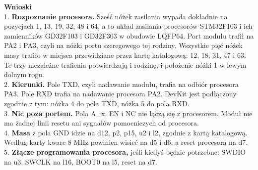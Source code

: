 \documentclass[10pt]{article}
\begin{document}
\vspace{10pt}
\textbf{Wnioski}\\[3pt]
1. \textbf{Rozpoznanie procesora.} Sześć nóżek zasilania wypada dokładnie na pozycjach 1, 13, 19, 32, 48 i 64, a to układ zasilania procesorów STM32F103 i ich zamienników GD32F103 i GD32F303 w obudowie LQFP64. Port modułu trafił na PA2 i PA3, czyli na nóżki portu szeregowego tej rodziny. Wszystkie pięć nóżek masy trafiło w miejsca przewidziane przez kartę katalogową: 12, 18, 31, 47 i 63. Te trzy niezależne trafienia potwierdzają i rodzinę, i położenie nóżki 1 w lewym dolnym rogu.\\[2pt]
2. \textbf{Kierunki.} Pole TXD, czyli nadawanie modułu, trafia na odbiór procesora PA3. Pole RXD trafia na nadawanie procesora PA2. DevKit jest podłączony zgodnie z tym: nóżka 4 do pola TXD, nóżka 5 do pola RXD.\\[2pt]
3. \textbf{Nic poza portem.} Pola A\_x, EN i NC nie łączą się z procesorem. Moduł nie ma żadnej linii resetu ani sygnałów pomocniczych od procesora.\\[2pt]
4. \textbf{Masa} z pola GND idzie na d12, p2, p15, u2 i l2, zgodnie z kartą katalogową. Według karty kwarc 8 MHz powinien wisieć na d5 i d6, a reset procesora na d7.\\[2pt]
5. \textbf{Złącze programowania procesora,} jeśli kiedyś będzie potrzebne: SWDIO na u3, SWCLK na l16, BOOT0 na l5, reset na d7.
\end{document}
